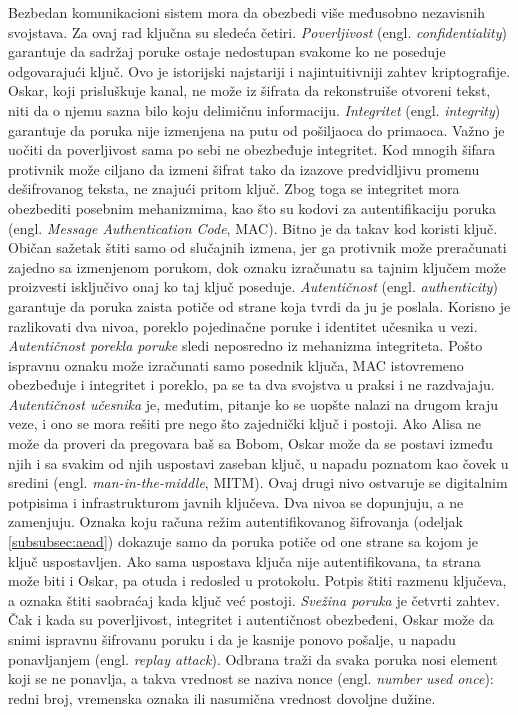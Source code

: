 Bezbedan komunikacioni sistem mora da obezbedi više međusobno nezavisnih svojstava. Za ovaj rad ključna su sledeća četiri.
\smallbreak
\textit{Poverljivost} (engl. \textit{confidentiality}) garantuje da sadržaj poruke ostaje nedostupan svakome ko ne poseduje odgovarajući ključ. Ovo je istorijski najstariji i najintuitivniji zahtev kriptografije. Oskar, koji prisluškuje kanal, ne može iz šifrata da rekonstruiše otvoreni tekst, niti da o njemu sazna bilo koju delimičnu informaciju.
\smallbreak
\textit{Integritet} (engl. \textit{integrity}) garantuje da poruka nije izmenjena na putu od pošiljaoca do primaoca. Važno je uočiti da poverljivost sama po sebi ne obezbeđuje integritet. Kod mnogih šifara protivnik može ciljano da izmeni šifrat tako da izazove predvidljivu promenu dešifrovanog teksta, ne znajući pritom ključ. Zbog toga se integritet mora obezbediti posebnim mehanizmima, kao što su kodovi za autentifikaciju poruka (engl. \textit{Message Authentication Code}, MAC). Bitno je da takav kod koristi ključ. Običan sažetak štiti samo od slučajnih izmena, jer ga protivnik može preračunati zajedno sa izmenjenom porukom, dok oznaku izračunatu sa tajnim ključem može proizvesti isključivo onaj ko taj ključ poseduje.
\smallbreak
\textit{Autentičnost} (engl. \textit{authenticity}) garantuje da poruka zaista potiče od strane koja tvrdi da ju je poslala. Korisno je razlikovati dva nivoa, poreklo pojedinačne poruke i identitet učesnika u vezi. \textit{Autentičnost porekla poruke} sledi neposredno iz mehanizma integriteta. Pošto ispravnu oznaku može izračunati samo posednik ključa, MAC istovremeno obezbeđuje i integritet i poreklo, pa se ta dva svojstva u praksi i ne razdvajaju. \textit{Autentičnost učesnika} je, međutim, pitanje ko se uopšte nalazi na drugom kraju veze, i ono se mora rešiti pre nego što zajednički ključ i postoji. Ako Alisa ne može da proveri da pregovara baš sa Bobom, Oskar može da se postavi između njih i sa svakim od njih uspostavi zaseban ključ, u napadu poznatom kao čovek u sredini (engl. \textit{man-in-the-middle}, MITM). Ovaj drugi nivo ostvaruje se digitalnim potpisima i infrastrukturom javnih ključeva.
\smallbreak
Dva nivoa se dopunjuju, a ne zamenjuju. Oznaka koju računa režim autentifikovanog šifrovanja (odeljak \ref{subsubsec:aead}) dokazuje samo da poruka potiče od one strane sa kojom je ključ uspostavljen. Ako sama uspostava ključa nije autentifikovana, ta strana može biti i Oskar, pa otuda i redosled u protokolu. Potpis štiti razmenu ključeva, a oznaka štiti saobraćaj kada ključ već postoji.
\smallbreak
\textit{Svežina poruka} je četvrti zahtev. Čak i kada su poverljivost, integritet i autentičnost obezbeđeni, Oskar može da snimi ispravnu šifrovanu poruku i da je kasnije ponovo pošalje, u napadu ponavljanjem (engl. \textit{replay attack}). Odbrana traži da svaka poruka nosi element koji se ne ponavlja, a takva vrednost se naziva nonce (engl. \textit{number used once}): redni broj, vremenska oznaka ili nasumična vrednost dovoljne dužine.
